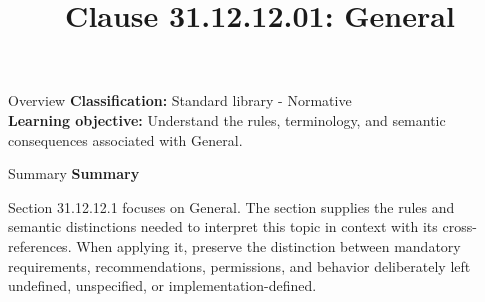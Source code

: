 \documentclass[10pt,letterpaper]{article}
\title{Clause 31.12.12.01: General}
\author{}
\date{}
\begin{document}
\maketitle
\begin{CornellOverviewBox}{Overview}
\textbf{Classification:} Standard library - Normative\\[2pt]
\textbf{Learning objective:} Understand the rules, terminology, and semantic consequences associated with General.
\end{CornellOverviewBox}\begin{CornellSummaryBox}{Summary}
{\sffamily\bfseries\color{Accent} Summary}\par\vspace{3pt}Section 31.12.12.1 focuses on General. The section supplies the rules and semantic distinctions needed to interpret this topic in context with its cross-references. When applying it, preserve the distinction between mandatory requirements, recommendations, permissions, and behavior deliberately left undefined, unspecified, or implementation-defined.
\end{CornellSummaryBox}
\end{document}
